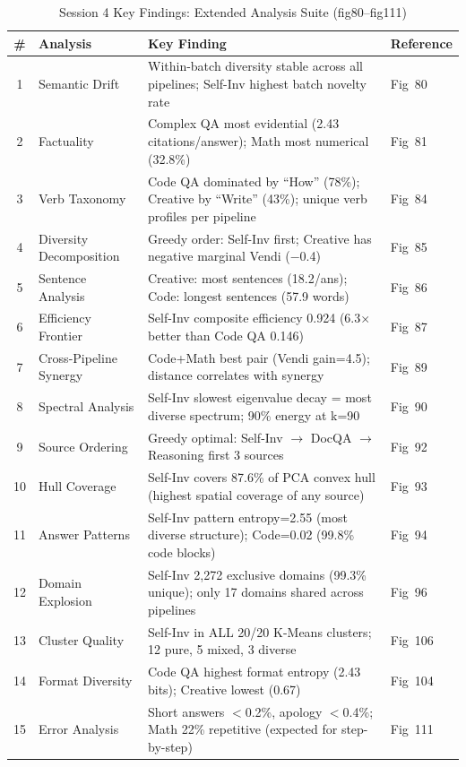 \begin{table}[t]
\centering
\caption{Session 4 Key Findings: Extended Analysis Suite (fig80--fig111)}
\label{tab:session4_findings}
\small
\begin{tabular}{clp{6cm}l}
\toprule
\textbf{\#} & \textbf{Analysis} & \textbf{Key Finding} & \textbf{Reference} \\
\midrule
1 & Semantic Drift & Within-batch diversity stable across all pipelines; Self-Inv highest batch novelty rate & Fig~80 \\
2 & Factuality & Complex QA most evidential (2.43 citations/answer); Math most numerical (32.8\%) & Fig~81 \\
3 & Verb Taxonomy & Code QA dominated by ``How'' (78\%); Creative by ``Write'' (43\%); unique verb profiles per pipeline & Fig~84 \\
4 & Diversity Decomposition & Greedy order: Self-Inv first; Creative has negative marginal Vendi ($-$0.4) & Fig~85 \\
5 & Sentence Analysis & Creative: most sentences (18.2/ans); Code: longest sentences (57.9 words) & Fig~86 \\
6 & Efficiency Frontier & Self-Inv composite efficiency 0.924 (6.3$\times$ better than Code QA 0.146) & Fig~87 \\
7 & Cross-Pipeline Synergy & Code+Math best pair (Vendi gain=4.5); distance correlates with synergy & Fig~89 \\
8 & Spectral Analysis & Self-Inv slowest eigenvalue decay = most diverse spectrum; 90\% energy at k=90 & Fig~90 \\
9 & Source Ordering & Greedy optimal: Self-Inv $\to$ DocQA $\to$ Reasoning first 3 sources & Fig~92 \\
10 & Hull Coverage & Self-Inv covers 87.6\% of PCA convex hull (highest spatial coverage of any source) & Fig~93 \\
11 & Answer Patterns & Self-Inv pattern entropy=2.55 (most diverse structure); Code=0.02 (99.8\% code blocks) & Fig~94 \\
12 & Domain Explosion & Self-Inv 2,272 exclusive domains (99.3\% unique); only 17 domains shared across pipelines & Fig~96 \\
13 & Cluster Quality & Self-Inv in ALL 20/20 K-Means clusters; 12 pure, 5 mixed, 3 diverse & Fig~106 \\
14 & Format Diversity & Code QA highest format entropy (2.43 bits); Creative lowest (0.67) & Fig~104 \\
15 & Error Analysis & Short answers $<$0.2\%, apology $<$0.4\%; Math 22\% repetitive (expected for step-by-step) & Fig~111 \\
\bottomrule
\end{tabular}
\end{table}
